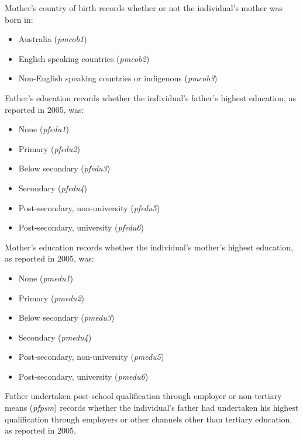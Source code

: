 \documentclass[12pt, a4paper]{article}
\begin{document}
Mother’s country of birth records whether or not the individual’s mother was born in:
\begin{itemize}
  \item Australia (\textit{p\textunderscore{}mcob1}) 
  \item English speaking countries (\textit{p\textunderscore{}mcob2})
  \item Non-English speaking countries or indigenous (\textit{p\textunderscore{}mcob3})
\end{itemize}  
 
Father’s education records whether the individual’s father’s highest education, as reported in 2005, was:
\begin{itemize}
  \item None (\textit{p\textunderscore{}fedu1})
  \item Primary (\textit{p\textunderscore{}fedu2})
  \item Below secondary (\textit{p\textunderscore{}fedu3})
  \item Secondary (\textit{p\textunderscore{}fedu4})
  \item Post-secondary, non-university (\textit{p\textunderscore{}fedu5})
  \item Post-secondary, university (\textit{p\textunderscore{}fedu6}) 
\end{itemize}
 
Mother’s education records whether the individual’s mother’s highest education, as reported in 2005, was:
\begin{itemize}
  \item None (\textit{p\textunderscore{}medu1})
  \item Primary (\textit{p\textunderscore{}medu2})
  \item Below secondary (\textit{p\textunderscore{}medu3})
  \item Secondary (\textit{p\textunderscore{}medu4})
  \item Post-secondary, non-university (\textit{p\textunderscore{}medu5})
  \item Post-secondary, university (\textit{p\textunderscore{}medu6}) 
\end{itemize}  
 
Father undertaken post-school qualification through employer or non-tertiary means (\textit{p\textunderscore{}fpsm}) records whether the individual’s father had undertaken his highest qualification through employers or other channels other than tertiary education, as reported in 2005. 
\end{document}
